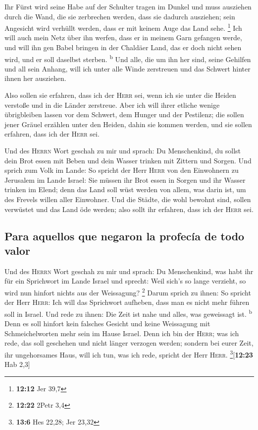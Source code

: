  Ihr Fürst wird seine Habe auf der Schulter tragen im
Dunkel und muss ausziehen durch die Wand, die sie zerbrechen werden,
dass sie dadurch ausziehen; sein Angesicht wird verhüllt werden, dass er
mit keinem Auge das Land sehe. \footnote{\textbf{12:12} Jer 39,7}
 Ich will auch mein Netz über ihn werfen, dass er in
meinem Garn gefangen werde, und will ihn gen Babel bringen in der
Chaldäer Land, das er doch nicht sehen wird, und er soll daselbst
sterben. \textsuperscript{b}  Und alle, die um ihn her
sind, seine Gehilfen und all sein Anhang, will ich unter alle Winde
zerstreuen und das Schwert hinter ihnen her ausziehen.

 Also sollen sie erfahren, dass ich der \textsc{Herr}
sei, wenn ich sie unter die Heiden verstoße und in die Länder zerstreue.
 Aber ich will ihrer etliche wenige übrigbleiben lassen
vor dem Schwert, dem Hunger und der Pestilenz; die sollen jener Gräuel
erzählen unter den Heiden, dahin sie kommen werden, und sie sollen
erfahren, dass ich der \textsc{Herr} sei.

 Und des \textsc{Herrn} Wort geschah zu mir und sprach:
 Du Menschenkind, du sollst dein Brot essen mit Beben und
dein Wasser trinken mit Zittern und Sorgen.  Und sprich
zum Volk im Lande: So spricht der Herr \textsc{Herr} von den Einwohnern
zu Jerusalem im Lande Israel: Sie müssen ihr Brot essen in Sorgen und
ihr Wasser trinken im Elend; denn das Land soll wüst werden von allem,
was darin ist, um des Frevels willen aller Einwohner. 
Und die Städte, die wohl bewohnt sind, sollen verwüstet und das Land öde
werden; also sollt ihr erfahren, dass ich der \textsc{Herr} sei.

\hypertarget{para-aquellos-que-negaron-la-profecuxeda-de-todo-valor}{%
\subsection{Para aquellos que negaron la profecía de todo
valor}\label{para-aquellos-que-negaron-la-profecuxeda-de-todo-valor}}

 Und des \textsc{Herrn} Wort geschah zu mir und sprach:
 Du Menschenkind, was habt ihr für ein Sprichwort im
Lande Israel und sprecht: Weil sich's so lange verzieht, so wird nun
hinfort nichts aus der Weissagung? \footnote{\textbf{12:22} 2Petr 3,4}
 Darum sprich zu ihnen: So spricht der Herr
\textsc{Herr}: Ich will das Sprichwort aufheben, dass man es nicht mehr
führen soll in Israel. Und rede zu ihnen: Die Zeit ist nahe und alles,
was geweissagt ist. \textsuperscript{b}  Denn es soll
hinfort kein falsches Gesicht und keine Weissagung mit Schmeichelworten
mehr sein im Hause Israel.  Denn ich bin der
\textsc{Herr}; was ich rede, das soll geschehen und nicht länger
verzogen werden; sondern bei eurer Zeit, ihr ungehorsames Haus, will ich
tun, was ich rede, spricht der Herr \textsc{Herr}.
\footnote{\textbf{13:6} Hes 22,28; Jer 23,32}{[}\textbf{12:23} Hab
2,3{]}

